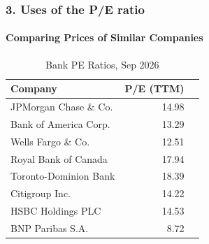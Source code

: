 \documentclass{beamer}
\begin{document}
\begin{frame}[t]
    \frametitle{3. Uses of the P/E ratio}
    \framesubtitle{Comparing Prices of Similar Companies}

    \begin{table}[h]
        \caption{Bank PE Ratios, Sep 2026}
        \label{tab:placeholder_label}
        \centering
        \begin{tabular}{lrr}
            \toprule
            Company & P/E (TTM) \\
            \midrule
            JPMorgan Chase \& Co. & 14.98 \\
            Bank of America Corp.  & 13.29 \\
            Wells Fargo \& Co. & 12.51 \\
            Royal Bank of Canada  & 17.94 \\
            Toronto-Dominion Bank  & 18.39 \\
            Citigroup Inc. & 14.22 \\
            HSBC Holdings PLC  & 14.53 \\
            BNP Paribas S.A.  & 8.72 \\
            \bottomrule
        \end{tabular}
    \end{table}


\end{frame}

\end{document}
